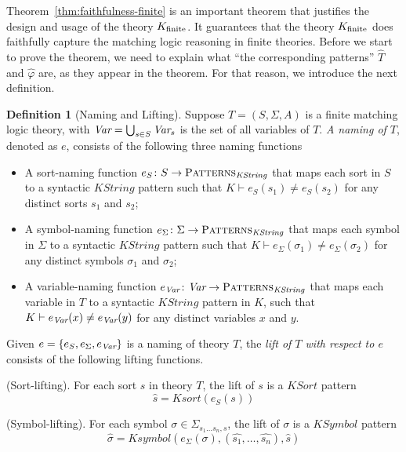 \documentclass[UTF8,11pt]{article}
\newcounter{thmcounter}
\theoremstyle{plain}
\theoremstyle{definition}
\newtheorem{definition} [thmcounter]{Definition}
\theoremstyle{remark}
\newcommand{\PATTERNS}{\text{P\textsc{atterns}}}
\newcommand{\KString}{\mathit{KString}}
\newcommand{\KSort}{\mathit{KSort}}
\newcommand{\Ksort}{\mathit{Ksort}}
\newcommand{\KSymbol}{\mathit{KSymbol}}
\newcommand{\Ksymbol}{\mathit{Ksymbol}}
\begin{document}
Theorem~\ref{thm:faithfulness-finite} is an important theorem that justifies the design and usage of the theory ${K_\text{finite}}$. 
It guarantees that the theory ${K_\text{finite}}$ does faithfully capture the matching logic reasoning in finite theories.
Before we start to prove the theorem, we need to explain what ``the corresponding patterns'' $\hat{T}$ and $\hat{\varphi}$ are, as they appear in the theorem.
For that reason, we introduce the next definition.

\begin{definition}[Naming and Lifting]
	Suppose $T = (S, \Sigma, A)$ is a finite matching logic theory, with $\textit{Var} = \bigcup_{s \in S} \textit{Var}_s$ is the set of all variables of $T$.
	\emph{A naming of $T$}, denoted as $e$, consists of the following three naming functions
	\begin{itemize}
		\item A sort-naming function $e_S \colon S \to \PATTERNS_\KString$ that maps each sort in $S$ to a syntactic $\KString$ pattern such that $K \vdash e_S(s_1) \neq e_S(s_2)$ for any distinct sorts $s_1$ and $s_2$;
		\item A symbol-naming function $e_\Sigma \colon \Sigma \to \PATTERNS_\KString$ that maps each symbol in $\Sigma$ to a syntactic $\KString$ pattern such that $K \vdash e_\Sigma(\sigma_1) \neq e_\Sigma(\sigma_2)$ for any distinct symbols $\sigma_1$ and $\sigma_2$;
		\item A variable-naming function $e_\Var \colon \Var \to \PATTERNS_\KString$ that maps each variable in $T$ to a syntactic $\KString$ pattern in $K$, such that $K \vdash e_{\textit{Var}}(x) \neq e_{\textit{Var}}(y)$ for any distinct variables $x$ and $y$.
	\end{itemize}

    Given $e = \{e_S, e_\Sigma, e_{\textit{Var}} \}$ is a naming of theory $T$, the \emph{lift of $T$ with respect to $e$} consists of the following lifting functions.
    
    (Sort-lifting).
    For each sort $s$ in theory $T$, the lift of $s$ is a $\KSort$ pattern
    $$ \hat{s} = \Ksort(e_S(s))$$
    
    (Symbol-lifting).
    For each symbol $\sigma \in \Sigma_{s_1 \dots s_n, s}$, the lift of $\sigma$ is a $\KSymbol$ pattern 
    $$ \hat{\sigma} = \Ksymbol(e_\Sigma(\sigma), (\hat{s_1}, \dots, \hat{s_n}), \hat{s})$$
    

\end{definition}
\end{document}
